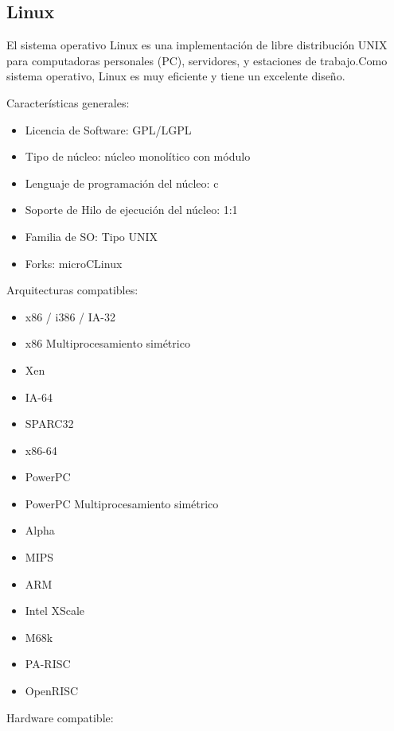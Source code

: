 	

			 \subsection{Linux}

El sistema operativo Linux es una implementación de libre distribución UNIX para computadoras personales (PC), servidores, y estaciones de trabajo.Como sistema operativo, Linux es muy eficiente y tiene un excelente diseño.

 
Características generales:

	\begin{itemize}
	\item Licencia de Software: GPL/LGPL
	\item Tipo de núcleo: núcleo monolítico con módulo
	\item Lenguaje de programación del núcleo: c
	\item Soporte de Hilo de ejecución del núcleo: 1:1
	\item Familia de SO: Tipo UNIX
	\item Forks: microCLinux	
	\end{itemize}			

Arquitecturas compatibles:

				\begin{itemize}
				\item x86 / i386 / IA-32
				\item x86 Multiprocesamiento simétrico
				\item Xen
				\item IA-64 	
				\item SPARC32
				\item x86-64
				\item PowerPC
				\item PowerPC Multiprocesamiento simétrico
				\item Alpha
				\item MIPS
				\item ARM
				\item Intel XScale
				\item M68k
				\item PA-RISC
				\item OpenRISC
			\end{itemize}			

Hardware compatible:

